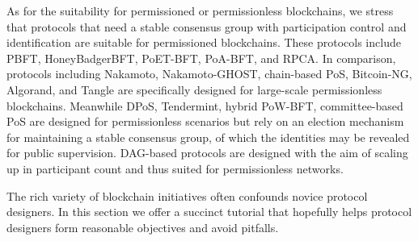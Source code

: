 {As for the suitability for permissioned or permissionless blockchains, we stress that protocols that need a stable consensus group with participation control and identification are suitable for permissioned blockchains. These protocols include PBFT, HoneyBadgerBFT, PoET-BFT, PoA-BFT, and RPCA. In comparison, protocols including Nakamoto, Nakamoto-GHOST, chain-based PoS, Bitcoin-NG, Algorand, and Tangle are specifically designed for large-scale permissionless blockchains. Meanwhile DPoS, Tendermint, hybrid PoW-BFT, committee-based PoS are designed for permissionless scenarios but rely on an election mechanism for maintaining a stable consensus group, of which the identities may be revealed for public supervision. DAG-based protocols are designed with the aim of scaling up in participant count and thus suited for permissionless networks.
}
{\color{\rcolor}

\label{sec:tutorial}
The rich variety of blockchain initiatives often confounds novice protocol designers.
In this section we offer a succinct tutorial that hopefully helps protocol designers form reasonable objectives and avoid pitfalls.
}

